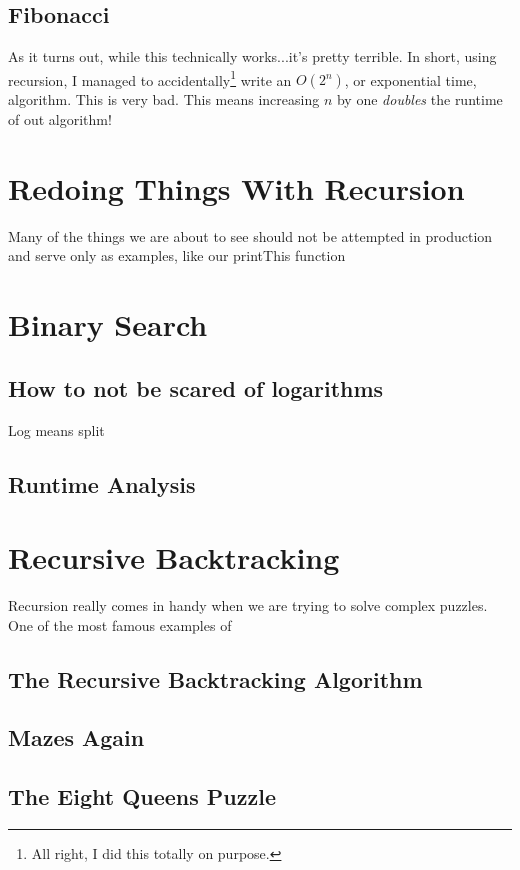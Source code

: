 \documentclass[10pt,a4paper]{book}
\begin{document}
\subsection{Fibonacci}
As it turns out, while this technically works...it's pretty terrible.  In short, using recursion, I managed to accidentally\footnote{All right, I did this totally on purpose.} write an $ O(2^n) $, or exponential time,  algorithm.  This is very bad.  This means increasing $ n $ by one \emph{doubles} the runtime of out algorithm!


\section{Redoing Things With Recursion}
Many of the things we are about to see should not be attempted in production and serve only as examples, like our printThis function


\section{Binary Search}

\subsection{How to not be scared of logarithms }
Log means split

\subsection{Runtime Analysis}


\section{Recursive Backtracking}
Recursion really comes in handy when we are trying to solve complex puzzles.
One of the most famous examples of 

\subsection*{The Recursive Backtracking Algorithm}


\subsection{Mazes Again}



\subsection{The Eight Queens Puzzle}
\end{document}
